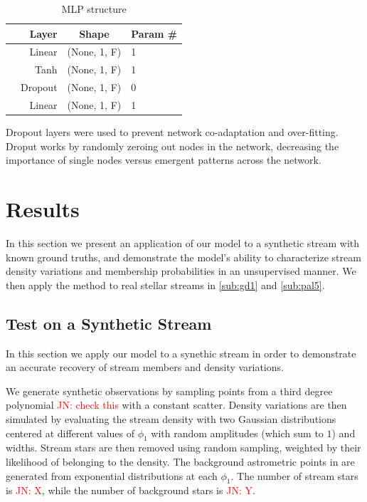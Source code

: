\documentclass[twocolumn]{aastex631}
\newcommand{\JN}[1]{{\textcolor{red}{JN: #1}}}
\begin{document}
        \begin{table}
            \centering
            \caption{MLP structure}
            \begin{tabular}{@{}rrcl@{}}
            \toprule
            & Layer & Shape & Param \# \\
            \midrule
            & Linear & (None, 1, F) & 1  \\
            & Tanh & (None, 1, F) & 1  \\
            & Dropout & (None, 1, F) & 0  \\
            & Linear & (None, 1, F) & 1  \\
            \bottomrule
            \end{tabular}
        \end{table}


        Dropout layers were used to prevent network co-adaptation and over-fitting. Droput works by randomly zeroing out nodes in the network, decreasing the importance of single nodes versus emergent patterns across the  network.

        

\section{Results} \label{sec:results}

    In this section we present an application of our model to a synthetic stream with known ground truths, and demonstrate the model's ability to characterize stream density variations and membership probabilities in an unsupervised manner. We then apply the method to real stellar streams in \autoref{sub:gd1} and \autoref{sub:pal5}.

    \subsection{Test on a Synthetic Stream} \label{sub:mock_data}
    
        In this section we apply our model to a synethic stream in order to demonstrate an accurate recovery of stream members and density variations.
    
        We generate synthetic observations by sampling points from a third degree polynomial \JN{check this} with a constant scatter. Density variations are then simulated by evaluating the stream density with two Gaussian distributions centered at different values of $\phi_1$ with random amplitudes (which sum to $1$) and widths. Stream stars are then removed using random sampling, weighted by their likelihood of belonging to the density. The background astrometric  points in are generated from exponential distributions at each $\phi_1$. The number of stream stars is \JN{X}, while the number of background stars is \JN{Y}.
    
\end{document}

